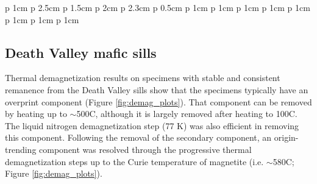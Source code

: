 \begin{table}
{\begin{tabular}{p {1cm} p {2.5cm} p {1.5cm} p {2cm} p {2.3cm} p {0.5cm} p {1cm} p {1cm} p {1cm} p {1cm} p {1cm} p {1cm} p {1cm} p {1cm} }
\hline
\end{tabular}
}
\caption[Site-level paleomagnetic data from mafic sills in Death Valley, Cardenas Basalt, and mafic intrusions in the Unkar Group]{Site-level paleomagnetic data from mafic sills in Death Valley, Cardenas Basalt, and mafic intrusions in the Unkar Group. dec$_{gc}$ and inc$_{gc}$ are site mean declination and inclination in geographic coordinates. dec$_{tc}$ and inc$_{tc}$ are site mean declination and inclination in tilt-corrected coordinates. k represents the Fisher concentration parameter of the site level mean directions. $\alpha_{95}$ represents the Fisher 95\% angular uncertainty of the site level mean directions. \textit{vgp lat} and \textit{vgp lon} represent the latitude and longitude of the site-level virtual geomagnetic poles calculated from tilt-corrected directional data. $^*$ marks sites that have paired high-precision zircon U-Pb ages developed by \cite{Mohr2024a}. CS1 is dated to be 1097.91 $\pm$ 0.29 Ma; CS7 is dated to be 1098.09 $\pm$ 0.91 Ma; UI4 is dated to be 1098.16 $\pm$ 0.59 Ma; UI5 is dated to be 1098.09 $\pm$ 0.34 Ma. All ages are presented with 95\% confidence. }
\label{tab:pmag_data}
\end{table}

\subsection*{Death Valley mafic sills}
Thermal demagnetization results on specimens with stable and consistent remanence from the Death Valley sills show that the specimens typically have an overprint component (Figure \ref{fig:demag_plots}). That component can be removed by heating up to $\sim$500\textdegree C, although it is largely removed after heating to 100\textdegree C. The liquid nitrogen demagnetization step (77 K) was also efficient in removing this component. Following the removal of the secondary component, an origin-trending component was resolved through the progressive thermal demagnetization steps up to the Curie temperature of magnetite (i.e. $\sim$580\textdegree C; Figure \ref{fig:demag_plots}).

